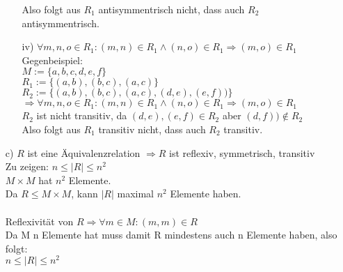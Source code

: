 \documentclass[paper = a4, ngerman]{scrartcl}
\begin{document}
\begin{itemize}
\begin{itemize}
				Also folgt aus 	$R_1 $ antisymmentrisch nicht, dass auch $R_2$ antisymmentrisch.
			\item[iv)]
				$\forall m,n,o \in R_1 : (m,n) \in R_1 \wedge (n,o) \in R_1 \Rightarrow (m,o) \in R_1$\\
				Gegenbeispiel:\\
				$M := \{a,b,c,d,e,f\}$\\
				$R_1 := \{(a,b),(b,c),(a,c)\}$\\
				$R_2 := \{(a,b),(b,c),(a,c),(d,e),(e,f))\}$\\
				$\Rightarrow \forall m,n,o \in R_1 : (m,n) \in R_1 \wedge (n,o) \in R_1 \Rightarrow (m,o) \in R_1$\\
				$R_2$ ist nicht transitiv, da $(d,e), (e,f) \in R_2 $ aber $(d,f)) \notin R_2$\\
				
				Also folgt aus 	$R_1 $ transitiv nicht, dass auch $R_2$ transitiv.
		\end{itemize}
	\item[c)]
		$R$ ist eine Äquivalenzrelation $\Rightarrow R$ ist reflexiv, symmetrisch, transitiv\\
		Zu zeigen: $n \le |R| \le n^2$\\
		$M \times M $ hat $n^2$ Elemente.\\ Da $R \le M \times M$, kann $|R|$ maximal $n^2$ Elemente haben.\\\\
		Reflexivität von $R \Rightarrow \forall m \in M : (m,m) \in R$\\
		Da M n Elemente hat muss damit R mindestens auch n Elemente haben, also folgt:\\
		$n \le |R| \le n^2$
\end{itemize}
\end{document}
